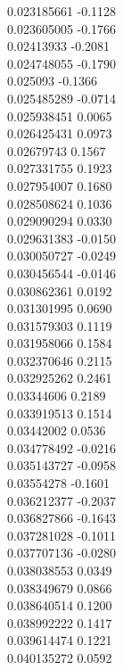 {        0.023185661	-0.1128\\
        0.023605005	-0.1766\\
        0.02413933	-0.2081\\
        0.024748055	-0.1790\\
        0.025093	-0.1366\\
        0.025485289	-0.0714\\
        0.025938451	0.0065\\
        0.026425431	0.0973\\
        0.02679743	0.1567\\
        0.027331755	0.1923\\
        0.027954007	0.1680\\
        0.028508624	0.1036\\
        0.029090294	0.0330\\
        0.029631383	-0.0150\\
        0.030050727	-0.0249\\
        0.030456544	-0.0146\\
        0.030862361	0.0192\\
        0.031301995	0.0690\\
        0.031579303	0.1119\\
        0.031958066	0.1584\\
        0.032370646	0.2115\\
        0.032925262	0.2461\\
        0.03344606	0.2189\\
        0.033919513	0.1514\\
        0.03442002	0.0536\\
        0.034778492	-0.0216\\
        0.035143727	-0.0958\\
        0.03554278	-0.1601\\
        0.036212377	-0.2037\\
        0.036827866	-0.1643\\
        0.037281028	-0.1011\\
        0.037707136	-0.0280\\
        0.038038553	0.0349\\
        0.038349679	0.0866\\
        0.038640514	0.1200\\
        0.038992222	0.1417\\
        0.039614474	0.1221\\
        0.040135272	0.0592\\
}

